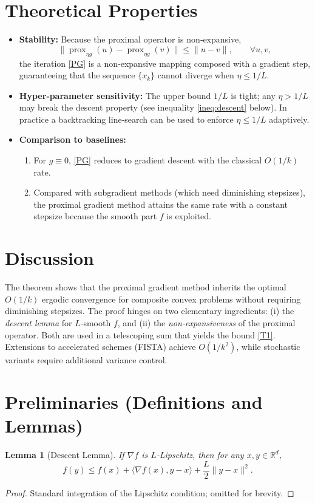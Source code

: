 \documentclass{article}
\newtheorem{lemma}{Lemma}
\newcommand{\prox}{\operatorname{prox}}
\newcommand{\R}{\mathbb{R}}
\begin{document}
\section*{Theoretical Properties}
\begin{itemize}
    \item \textbf{Stability:} Because the proximal operator is non‑expansive,
    \[
    \|\prox_{\eta g}(u)-\prox_{\eta g}(v)\|\le\|u-v\|,\qquad\forall u,v,
    \tag{P1}
    \]
    the iteration \eqref{PG} is a non‑expansive mapping composed with a gradient step, guaranteeing that the sequence $\{x_{k}\}$ cannot diverge when $\eta\le 1/L$.
    \item \textbf{Hyper‑parameter sensitivity:} The upper bound $1/L$ is tight; any $\eta>1/L$ may break the descent property (see inequality \eqref{ineq:descent} below). In practice a backtracking line‑search can be used to enforce $\eta\le 1/L$ adaptively.
    \item \textbf{Comparison to baselines:}
    \begin{enumerate}[label=(\alph*)]
        \item For $g\equiv0$, \eqref{PG} reduces to gradient descent with the classical $O(1/k)$ rate.
        \item Compared with subgradient methods (which need diminishing stepsizes), the proximal gradient method attains the same rate with a constant stepsize because the smooth part $f$ is exploited.
    \end{enumerate}
\end{itemize}

\section*{Discussion}
The theorem shows that the proximal gradient method inherits the optimal $O(1/k)$ ergodic convergence for composite convex problems without requiring diminishing stepsizes. The proof hinges on two elementary ingredients: (i) the \emph{descent lemma} for $L$‑smooth $f$, and (ii) the \emph{non‑expansiveness} of the proximal operator. Both are used in a telescoping sum that yields the bound \eqref{T1}. Extensions to accelerated schemes (FISTA) achieve $O(1/k^{2})$, while stochastic variants require additional variance control.

\newpage
\section*{Preliminaries (Definitions and Lemmas)}
\begin{lemma}[Descent Lemma]\label{lem:descent}
If $\nabla f$ is $L$‑Lipschitz, then for any $x,y\in\R^{d}$,
\[
f(y)\le f(x)+\langle\nabla f(x),y-x\rangle+\frac{L}{2}\|y-x\|^{2}.
\tag{L1}
\]
\end{lemma}
\begin{proof}
Standard integration of the Lipschitz condition; omitted for brevity. \qedhere
\end{proof}
\end{document}
